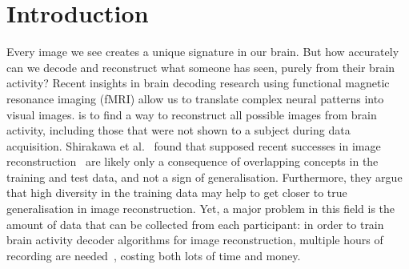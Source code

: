 \chapter{Introduction}

\noindent{}

\noindent{}



\noindent{}Every image we see creates a unique signature in our brain. But how accurately can we decode and reconstruct what someone has seen, purely from their brain activity? Recent insights in brain decoding research using functional magnetic resonance imaging (fMRI) allow us to translate complex neural patterns into visual images\cite{shenDeepImageReconstruction2019,scottiMindEye2SharedSubjectModels2024,ozcelikNaturalSceneReconstruction2023}.   is to find a way to reconstruct all possible images from brain activity, including those that were not shown to a subject during data acquisition. Shirakawa et al.~\cite{shirakawaSpuriousReconstructionBrain2024} found that supposed recent successes in image reconstruction~\cite{ozcelikNaturalSceneReconstruction2023,scottiMindEye2SharedSubjectModels2024} are likely only a consequence of overlapping concepts in the training and test data, and not a sign of generalisation. Furthermore, they argue that high diversity in the training data may help to get closer to true generalisation in image reconstruction. Yet, a major problem in this field is the amount of data that can be collected from each participant: in order to train brain activity decoder algorithms for image reconstruction, multiple hours of recording are needed~\cite{horikawaGenericDecodingSeen2017,gifford7TFMRIDataset2025,hebartTHINGSdataMultimodalCollection2023}, costing both lots of time and money. 

